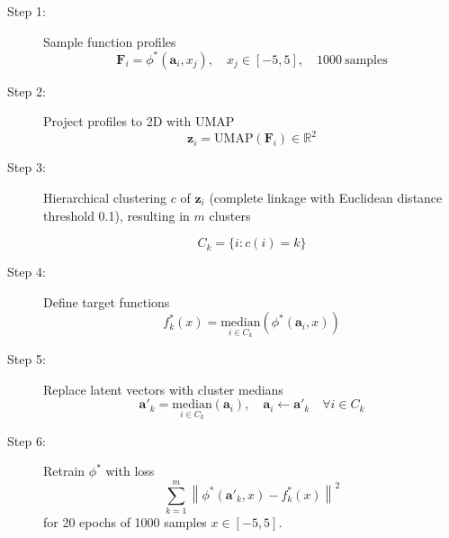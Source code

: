\documentclass[10pt,twocolumn]{article}
\renewcommand\Vec[1]{\ensuremath{\boldsymbol{#1}}}
\begin{document}
\begin{description}
\item[Step 1:]{Sample function profiles
\[
\Vec{F}_i = \phi^*(\Vec{a}_i, x_j), \quad x_j \in [-5,5], \quad 1000~\text{samples}
\]
}
\item[Step 2:]{Project profiles to 2D with UMAP
\[
\Vec{z}_i = \text{UMAP}(\Vec{F}_i) \in \mathbb{R}^2
\]
}
\item[Step 3:]{Hierarchical clustering $c$ of $\Vec{z}_i$ (complete linkage with Euclidean distance threshold 0.1), resulting in $m$ clusters

\[
C_k = \{i: c(i) = k\}
\]
}
\item[Step 4:]{Define target functions
\[
f^*_k(x) = \underset{i \in C_k}{\text{median}}(\phi^*(\Vec{a}_i, x))
\]
}
\item[Step 5:]{Replace latent vectors with cluster medians
\[
\Vec{a}'_k = \underset{i \in C_k}{\text{median}}(\Vec{a}_i), \quad \Vec{a}_i \leftarrow \Vec{a}'_k \quad \forall i \in C_k
\]
}
\item[Step 6:]{Retrain $\phi^*$ with loss
\[
\sum_{k=1}^m \left\| \phi^*(\Vec{a}'_k, x) - f_k^*(x) \right\|^2
\]
for 20 epochs of 1000 samples $x \in [-5,5]$.
}
\end{description}
\end{document}
